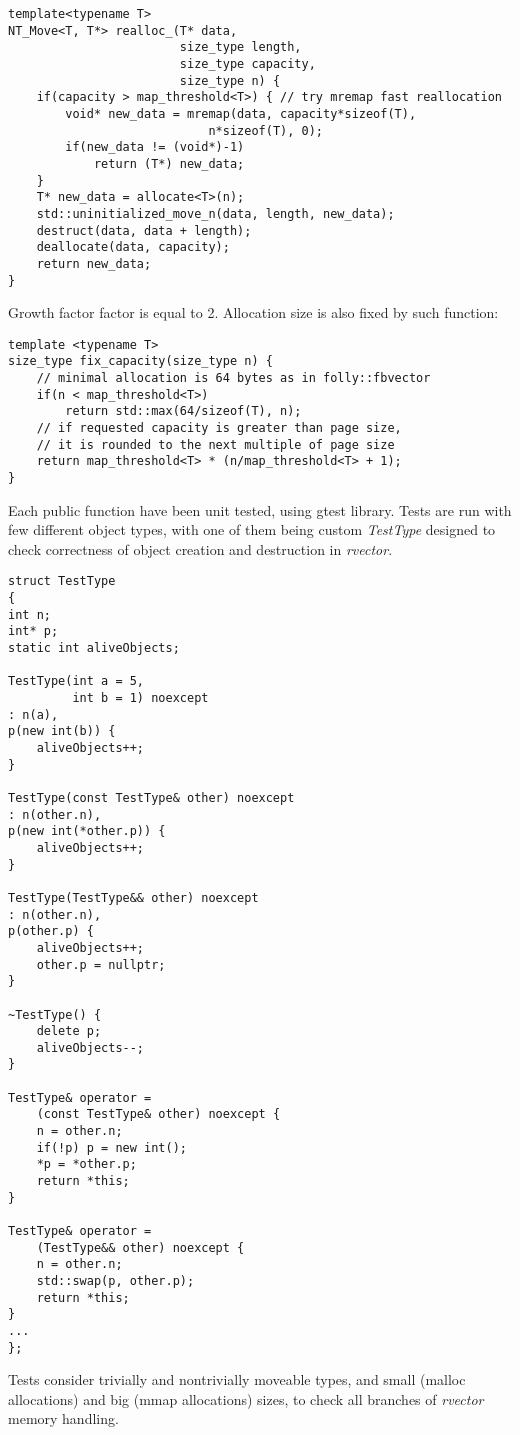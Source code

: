 \documentclass[inz, english, shortabstract]{iithesis}
\begin{document}
\begin{lstlisting}[caption=rvector nontrivial type reallocation]
template<typename T>
NT_Move<T, T*> realloc_(T* data, 
						size_type length, 
						size_type capacity, 
						size_type n) {
    if(capacity > map_threshold<T>) { // try mremap fast reallocation
        void* new_data = mremap(data, capacity*sizeof(T), 
                    		n*sizeof(T), 0);
        if(new_data != (void*)-1)
        	return (T*) new_data;
    }
    T* new_data = allocate<T>(n);
    std::uninitialized_move_n(data, length, new_data);
    destruct(data, data + length);
    deallocate(data, capacity);
    return new_data;
}
\end{lstlisting}
Growth factor factor is equal to 2. Allocation size is also fixed by such function: 

\begin{lstlisting}[caption=fix capacity]
template <typename T>
size_type fix_capacity(size_type n) {
	// minimal allocation is 64 bytes as in folly::fbvector
	if(n < map_threshold<T>)
        return std::max(64/sizeof(T), n);
    // if requested capacity is greater than page size,
    // it is rounded to the next multiple of page size
    return map_threshold<T> * (n/map_threshold<T> + 1);
}
\end{lstlisting}
Each public function have been unit tested, using gtest library\cite{rvector_tests}. Tests are run with few different object types, with one of them being custom {\it TestType} designed to check correctness of object creation and destruction in {\it rvector}.

\begin{lstlisting}[caption=TestType, multicols=2, label=TestType_impl]
struct TestType
{
int n;
int* p;
static int aliveObjects;

TestType(int a = 5, 
		 int b = 1) noexcept
: n(a),
p(new int(b)) {
	aliveObjects++;
}

TestType(const TestType& other) noexcept
: n(other.n),
p(new int(*other.p)) {
	aliveObjects++;
}

TestType(TestType&& other) noexcept
: n(other.n),
p(other.p) {
	aliveObjects++;
	other.p = nullptr;
}

~TestType() {
	delete p;
	aliveObjects--;
}

TestType& operator = 
	(const TestType& other) noexcept {
	n = other.n;
	if(!p) p = new int();
	*p = *other.p;
	return *this;
}

TestType& operator = 
	(TestType&& other) noexcept {
	n = other.n;
	std::swap(p, other.p);
	return *this;
}
...
};
\end{lstlisting}
Tests consider trivially and nontrivially moveable types, and small (malloc allocations) and big (mmap allocations) sizes, to check all branches of {\it rvector} memory handling.
\end{document}
